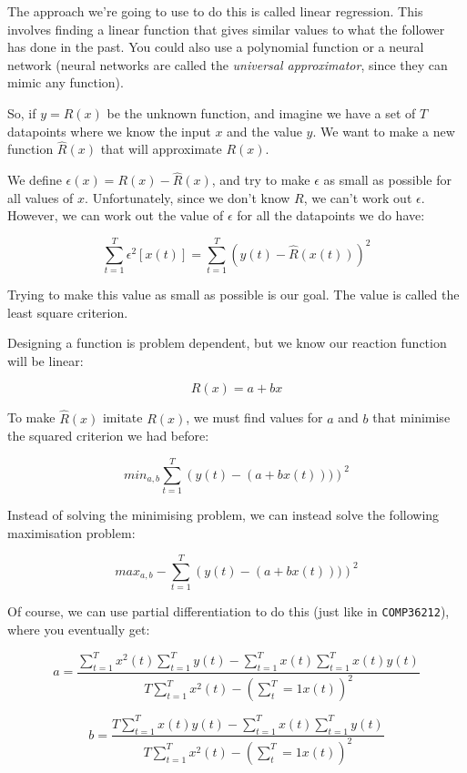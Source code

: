 The approach we're going to use to do this is called linear regression. This
involves finding a linear function that gives similar values to what the
follower has done in the past. You could also use a polynomial function or a
neural network (neural networks are called the \textit{universal approximator},
since they can mimic any function).

So, if $y = R(x)$ be the unknown function, and imagine we have a set of $T$
datapoints where we know the input $x$ and the value $y$. We want to make a new
function $\hat{R}(x)$ that will approximate $R(x)$.

We define $\epsilon(x) = R(x) - \hat{R}(x)$, and try to make $\epsilon$ as small
as possible for all values of $x$. Unfortunately, since we don't know $R$, we
can't work out $\epsilon$. However, we can work out the value of $\epsilon$ for
all the datapoints we do have:

\[
  \sum^T_{t=1}\epsilon^2[x(t)] = \sum^T_{t=1}\left(y(t) - \hat{R}(x(t))\right)^2
\]

Trying to make this value as small as possible is our goal. The value is called
the least square criterion.

Designing a function is problem dependent, but we know our reaction function
will be linear:

\[
  R(x) = a + bx
\]

To make $\hat{R}(x)$ imitate $R(x)$, we must find values for $a$ and $b$ that
minimise the squared criterion we had before:

\[
  min_{a,b} \sum^T_{t=1}\left(y(t) - (a + b x(t)))\right)^2
\]

Instead of solving the minimising problem, we can instead solve the following
maximisation problem:

\[
  max_{a,b} - \sum^T_{t=1}\left(y(t) - (a + b x(t)))\right)^2
\]

Of course, we can use partial differentiation to do this (just like in
\texttt{COMP36212}), where you eventually get:

\[
  a = \frac{
    \sum^T_{t=1}x^2(t)\sum^T_{t=1}y(t) - \sum^T_{t=1}x(t)\sum^T_{t=1}x(t)y(t)
  }{
    T\sum^T_{t=1}x^2(t) - (\sum^T_t{=1}x(t))^2
  }
\]

\[
  b = \frac{
    T\sum^T_{t=1}x(t)y(t) - \sum^T_{t=1}x(t)\sum^T_{t=1}y(t)
  }{
    T\sum^T_{t=1}x^2(t) - (\sum^T_t{=1}x(t))^2
  }
\]
